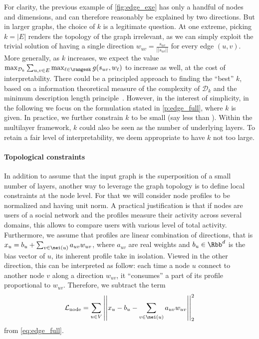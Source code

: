 For clarity, the previous example of \autoref{fig:edge_exe} has only a handful of nodes and
dimensions, and can therefore reasonably be explained by two directions. But in larger graphs, the
choice of $k$ is a legitimate question.
At one extreme, picking $k=|E|$ renders the topology of the graph
irrelevant, as we can simply exploit the trivial
solution of having a single direction $w_{uv} = \frac{s_{uv}}{||s_{uv}||}$ for every edge $(u,v)$.
More generally, as $k$ increases, we expect the value $\max_{\mathcal{D}_k} \sum_{u,v \in E}
\max_{\ell \in \rangesk} g(s_{uv}, w_{\ell})$ to increase as
well, at the cost of interpretability. There could be a principled approach to finding the
\enquote{best} $k$, based on a information theoretical measure of the complexity of $\mathcal{D}_k$
and the minimum description length principle~\autocite{grunwald2005tutorial}. However, in the
interest of simplicity, in the following we focus on the formulation stated in
\autoref{p:edge_full}, where $k$ is given. In practice, we further constrain $k$ to be small (say
less than ). Within the multilayer framework, $k$ could also be seen as the number of
underlying layers. To retain a fair level of interpretability, we deem appropriate to have $k$ not
too large.

\paragraph{Topological constraints}

In addition to assume that the input graph is the superposition of a small number of layers,
another way to leverage the graph topology is to define local constraints at the node level.
For that we will consider node profiles to be normalized and having unit norm. A practical
justification is that if nodes are
users of a social network and the profiles measure their activity across several domains, this
allows to compare users with various level of total activity. Furthermore, we assume that profiles
are linear combination of directions, that
is $x_u = b_u + \sum_{v \in \nei(u)} a_{uv} w_{uv}$, where $a_{uv}$ are real weights and $b_u
\in \Rbb^d$ is the bias vector of $u$, its inherent profile take in isolation.
Viewed in the other direction, this can be interpreted as follow: each time a node $u$
connect to another node $v$ along a direction $w_{uv}$, it \enquote{consumes} a part of its profile
proportional to $w_{uv}$. Therefore, we subtract the term
\begin{equation}
  \label{eq:edge_node_loss}
  \mathcal{L}_{\mathrm{node}} =
  \sum_{u\in V} \left|\left| x_u - b_u - \sum_{v \in \nei(u)} a_{uv} w_{uv} \right|\right|^2_2
\end{equation}
from \eqref{eq:edge_full}.

